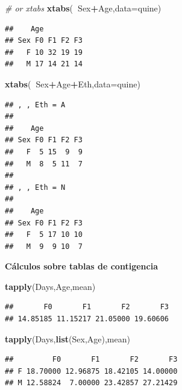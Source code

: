 \documentclass[]{book}
\newenvironment{Shaded}{\begin{snugshade}}{\end{snugshade}}
\newcommand{\KeywordTok}[1]{\textcolor[rgb]{0.13,0.29,0.53}{\textbf{#1}}}
\newcommand{\DataTypeTok}[1]{\textcolor[rgb]{0.13,0.29,0.53}{#1}}
\newcommand{\CommentTok}[1]{\textcolor[rgb]{0.56,0.35,0.01}{\textit{#1}}}
\newcommand{\OperatorTok}[1]{\textcolor[rgb]{0.81,0.36,0.00}{\textbf{#1}}}
\newcommand{\NormalTok}[1]{#1}
\begin{document}
\begin{Shaded}
\begin{Highlighting}[]
\CommentTok{# or xtabs}
\KeywordTok{xtabs}\NormalTok{(}\OperatorTok{~}\NormalTok{Sex}\OperatorTok{+}\NormalTok{Age,}\DataTypeTok{data=}\NormalTok{quine)}
\end{Highlighting}
\end{Shaded}

\begin{verbatim}
##    Age
## Sex F0 F1 F2 F3
##   F 10 32 19 19
##   M 17 14 21 14
\end{verbatim}

\begin{Shaded}
\begin{Highlighting}[]
\KeywordTok{xtabs}\NormalTok{(}\OperatorTok{~}\NormalTok{Sex}\OperatorTok{+}\NormalTok{Age}\OperatorTok{+}\NormalTok{Eth,}\DataTypeTok{data=}\NormalTok{quine)}
\end{Highlighting}
\end{Shaded}

\begin{verbatim}
## , , Eth = A
## 
##    Age
## Sex F0 F1 F2 F3
##   F  5 15  9  9
##   M  8  5 11  7
## 
## , , Eth = N
## 
##    Age
## Sex F0 F1 F2 F3
##   F  5 17 10 10
##   M  9  9 10  7
\end{verbatim}

\textbf{Cálculos sobre tablas de contigencia}

\begin{Shaded}
\begin{Highlighting}[]
\KeywordTok{tapply}\NormalTok{(Days,Age,mean)}
\end{Highlighting}
\end{Shaded}

\begin{verbatim}
##       F0       F1       F2       F3 
## 14.85185 11.15217 21.05000 19.60606
\end{verbatim}

\begin{Shaded}
\begin{Highlighting}[]
\KeywordTok{tapply}\NormalTok{(Days,}\KeywordTok{list}\NormalTok{(Sex,Age),mean)}
\end{Highlighting}
\end{Shaded}

\begin{verbatim}
##         F0       F1       F2       F3
## F 18.70000 12.96875 18.42105 14.00000
## M 12.58824  7.00000 23.42857 27.21429
\end{verbatim}
\end{document}
